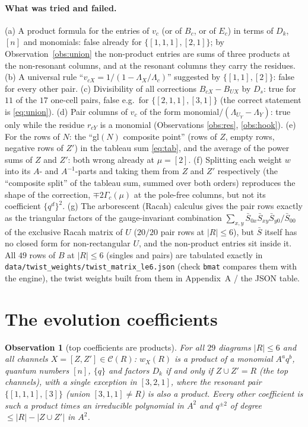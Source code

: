 \documentclass[11pt]{article}
\newtheorem{observation}{Observation}
\newcommand{\Lam}{\Lambda}
\newcommand{\Chan}{\mathcal C}
\newcommand{\LMPH}[1]{\texttt{#1}}
\begin{document}
\paragraph{What was tried and failed.}  (a) A product formula for the entries of $v_c$ (or of $B_c$, or of $E_c$)
in terms of $D_k$, $[n]$ and monomials: false already for $\{[1,1,1],[2,1]\}$; by Observation~\ref{obs:union} the
non-product entries are sums of three products at the non-resonant columns, and at the resonant columns they carry
the residues.  (b) A universal rule ``$v_{cX}=1/(1-\Lam_X/\Lam_c)$'' suggested by $\{[1,1],[2]\}$: false for every
other pair.  (c) Divisibility of all corrections $B_{cX}-B_{UX}$ by $D_s$: true for $11$ of the $17$ one-cell pairs,
false e.g.\ for $\{[2,1,1],[3,1]\}$ (the correct statement is \eqref{eq:union}).  (d) Pair columns of $v_c$ of the form
monomial$/(\Lam_{U_Y}-\Lam_Y)$: true only while the residue $r_{cY}$ is a monomial (Observations \ref{obs:res},
\ref{obs:hook}).  (e) For the rows of $N$: the ``gl$(N)$ composite point'' (rows of $Z$, empty rows, negative rows of
$Z'$) in the tableau sum \eqref{eq:tab}, and the average of the power sums of $Z$ and $Z'$: both wrong already at
$\mu=[2]$.  (f) Splitting each weight $w$ into its $A$- and $A^{-1}$-parts and taking them from $Z$ and $Z'$
respectively (the ``composite split'' of the tableau sum, summed over both orders) reproduces the shape of the
correction, $\mp2\Gamma_c(\mu)$ at the pole-free columns, but not its coefficient $\{q^d\}^2$.  (g) The arborescent
(Racah) calculus gives the pair rows exactly as the triangular factors of the gauge-invariant combination
$\sum_{x,y}\bar S_{0x}\bar S_{xy}\bar S_{y0}/\bar S_{00}$ of the exclusive Racah matrix of $U$ ($20/20$ pair rows at
$|R|\le6$), but $\bar S$ itself has no closed form for non-rectangular $U$, and the non-product entries sit inside it.
All $49$ rows of $B$ at $|R|\le6$ (singles and pairs) are tabulated exactly in \LMPH{data/twist\_weights/twist\_matrix\_le6.json}
(check \LMPH{bmat} compares them with the engine), the twist weights built from them in Appendix~A / the JSON table.


\section{The evolution coefficients}\label{sec:weights}

\begin{observation}[top coefficients are products]\label{obs:top}
For all $29$ diagrams $|R|\le6$ and all channels $X=[Z,Z']\in\Chan(R)$: $w_X(R)$ is a product of a monomial
$A^aq^b$, quantum numbers $[n]$, $\{q\}$ and factors $D_k$ if and only if $Z\cup Z'=R$ (the \emph{top} channels), with
a single exception in $[3,2,1]$, where the resonant pair $\{[1,1,1],[3]\}$ (union $[3,1,1]\ne R$) is also a product.
Every other coefficient is such a product times an irreducible polynomial in $A^2$ and $q^{\pm2}$ of degree
$\le|R|-|Z\cup Z'|$ in $A^2$.
\end{observation}
\end{document}
